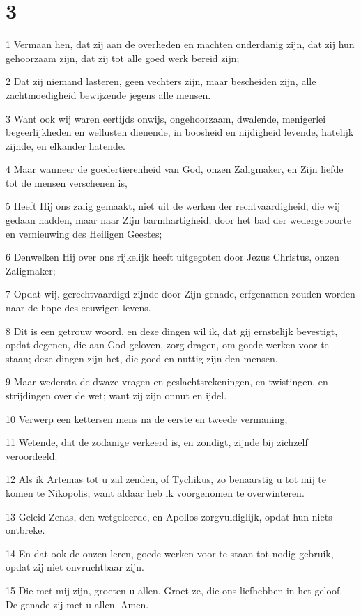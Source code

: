 \chapter{3}

\par 1 Vermaan hen, dat zij aan de overheden en machten onderdanig zijn, dat zij hun gehoorzaam zijn, dat zij tot alle goed werk bereid zijn;
\par 2 Dat zij niemand lasteren, geen vechters zijn, maar bescheiden zijn, alle zachtmoedigheid bewijzende jegens alle mensen.
\par 3 Want ook wij waren eertijds onwijs, ongehoorzaam, dwalende, menigerlei begeerlijkheden en wellusten dienende, in boosheid en nijdigheid levende, hatelijk zijnde, en elkander hatende.
\par 4 Maar wanneer de goedertierenheid van God, onzen Zaligmaker, en Zijn liefde tot de mensen verschenen is,
\par 5 Heeft Hij ons zalig gemaakt, niet uit de werken der rechtvaardigheid, die wij gedaan hadden, maar naar Zijn barmhartigheid, door het bad der wedergeboorte en vernieuwing des Heiligen Geestes;
\par 6 Denwelken Hij over ons rijkelijk heeft uitgegoten door Jezus Christus, onzen Zaligmaker;
\par 7 Opdat wij, gerechtvaardigd zijnde door Zijn genade, erfgenamen zouden worden naar de hope des eeuwigen levens.
\par 8 Dit is een getrouw woord, en deze dingen wil ik, dat gij ernstelijk bevestigt, opdat degenen, die aan God geloven, zorg dragen, om goede werken voor te staan; deze dingen zijn het, die goed en nuttig zijn den mensen.
\par 9 Maar wedersta de dwaze vragen en geslachtsrekeningen, en twistingen, en strijdingen over de wet; want zij zijn onnut en ijdel.
\par 10 Verwerp een kettersen mens na de eerste en tweede vermaning;
\par 11 Wetende, dat de zodanige verkeerd is, en zondigt, zijnde bij zichzelf veroordeeld.
\par 12 Als ik Artemas tot u zal zenden, of Tychikus, zo benaarstig u tot mij te komen te Nikopolis; want aldaar heb ik voorgenomen te overwinteren.
\par 13 Geleid Zenas, den wetgeleerde, en Apollos zorgvuldiglijk, opdat hun niets ontbreke.
\par 14 En dat ook de onzen leren, goede werken voor te staan tot nodig gebruik, opdat zij niet onvruchtbaar zijn.
\par 15 Die met mij zijn, groeten u allen. Groet ze, die ons liefhebben in het geloof. De genade zij met u allen. Amen.




